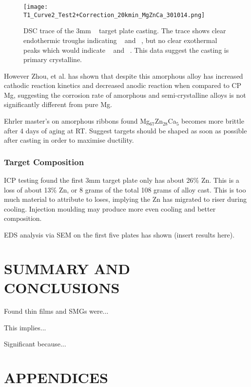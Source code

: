 \documentclass[draft,a4paper,12pt,oneside]{report}%
\begin{document}
\begin{figure}[htbp]
	\centering
	\texttt{[image: T1\_Curve2\_Test2+Correction\_20kmin\_MgZnCa\_301014.png]}
	\caption[Target DSC]{DSC trace of the 3mm \MgZnCa~ target plate casting. The trace shows clear endothermic troughs indicating  \Tm~  and \Tl~, but no clear exothermal peaks which would indicate \Tg~  and \Tx~. This data suggest the casting is primary crystalline.}
	\label{fig:DSCTarget1}
\end{figure}

However Zhou, et al. \cite{Zhou2013} has shown that despite this amorphous alloy has increased cathodic reaction kinetics and decreased anodic reaction when compared to CP Mg, suggesting the corrosion rate of amorphous and semi-crystalline alloys is not significantly different from pure Mg. 

Ehrler \cite{Ehrler2008} master's on amorphous ribbons found Mg$_{67}$Zn$_{28}$Ca$_{5}$ becomes more brittle after 4 days of aging at RT. Suggest targets should be shaped as soon as possible after casting in order to maximise ductility. 

\subsection{Target Composition}

ICP testing found the first 3mm target plate only has about 26\% Zn. This is a loss of about 13\% Zn, or 8 grams of the total 108 grams of alloy cast.  This is too much material to attribute to loses, implying the Zn has migrated to riser during cooling. Injection moulding may produce more even cooling and better composition. 

EDS analysis via SEM on the first five plates has shown (insert results here). 

\chapter{SUMMARY AND CONCLUSIONS}
\glsresetall

Found thin films and SMGs were...

This implies...

Significant because...




\chapter{APPENDICES}
\samepage
\glsaddall
\printglossaries
\end{document}
